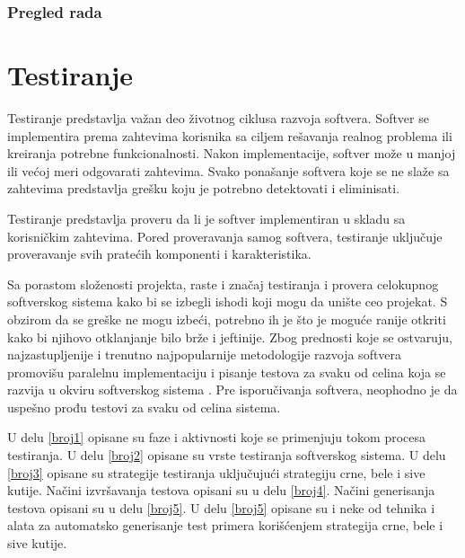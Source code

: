 \documentclass[12pt,oneside]{memoir}
\begin{document}
\subsection{Pregled rada}


\chapter{Testiranje}

Testiranje predstavlja važan deo životnog ciklusa razvoja softvera. 
Softver se implementira prema zahtevima korisnika sa ciljem rešavanja realnog problema ili kreiranja potrebne funkcionalnosti. Nakon implementacije, softver može u manjoj ili većoj meri odgovarati zahtevima. Svako ponašanje softvera koje se ne slaže sa zahtevima predstavlja grešku koju je potrebno detektovati i eliminisati. 
\par
Testiranje predstavlja proveru da li je softver implementiran u skladu sa korisničkim zahtevima. Pored proveravanja samog softvera, testiranje uključuje proveravanje svih pratećih komponenti i karakteristika. 
\par 
Sa porastom složenosti projekta, raste i značaj testiranja i provera celokupnog softverskog sistema kako bi se izbegli ishodi koji mogu da unište ceo projekat. 
S obzirom da se greške ne mogu izbeći, potrebno ih je što je moguće ranije otkriti kako bi njihovo otklanjanje bilo brže i jeftinije. Zbog prednosti koje se ostvaruju, najzastupljenije i trenutno najpopularnije metodologije razvoja softvera promovišu paralelnu implementaciju i pisanje testova za svaku od celina koja se razvija u okviru softverskog sistema \cite{AgileDevelopment}. Pre isporučivanja softvera, neophodno je da uspešno prođu testovi za svaku od celina sistema.
\par 

U delu \ref{broj1} opisane su faze i aktivnosti koje se primenjuju tokom procesa testiranja. U delu \ref{broj2} opisane su vrste testiranja softverskog sistema. U delu \ref{broj3} opisane su strategije testiranja uključujući strategiju crne, bele i sive kutije. Načini izvršavanja testova opisani su u delu \ref{broj4}. Načini generisanja testova opisani su u delu \ref{broj5}. U delu \ref{broj5} opisane su i neke od tehnika i alata za automatsko generisanje test primera korišćenjem strategija crne, bele i sive kutije. 
\end{document}
